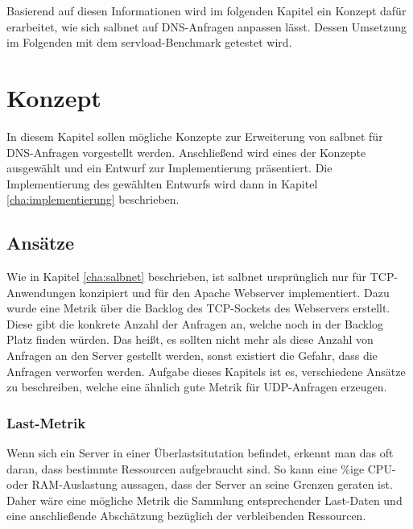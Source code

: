 \documentclass[a4paper, 12pt, BCOR10mm, DIV12, toc=bibliography, toc=listof, german]{scrbook}
\begin{document}
			Basierend auf diesen Informationen wird im folgenden Kapitel ein Konzept dafür erarbeitet, wie
			sich salbnet auf DNS-Anfragen anpassen lässt.  Dessen Umsetzung im Folgenden mit dem
			servload-Benchmark getestet wird.



	\chapter{Konzept} %
	\label{cha:konzept}

	In diesem Kapitel sollen mögliche Konzepte zur Erweiterung von salbnet für DNS-Anfragen
	vorgestellt werden. Anschließend wird eines der Konzepte ausgewählt und ein Entwurf zur Implementierung
	präsentiert. Die Implementierung des gewählten Entwurfs wird dann in Kapitel
	\ref{cha:implementierung} beschrieben.


		\section{Ansätze} %
		\label{sec:ansaetze}

		Wie in Kapitel \ref{cha:salbnet} beschrieben, ist salbnet ursprünglich nur für TCP-Anwendungen
		konzipiert und für den Apache Webserver implementiert. Dazu wurde eine Metrik über die Backlog
		des TCP-Sockets des Webservers erstellt. Diese gibt die konkrete Anzahl der Anfragen an, welche
		noch in der Backlog Platz finden würden. Das heißt, es sollten nicht mehr als diese Anzahl von
		Anfragen an den Server gestellt werden, sonst existiert die Gefahr, dass die Anfragen verworfen
		werden. Aufgabe dieses Kapitels ist es, verschiedene Ansätze zu beschreiben, welche eine ähnlich
		gute Metrik für UDP-Anfragen erzeugen.

		\subsection*{Last-Metrik} %

		Wenn sich ein Server in einer Überlastsitutation befindet, erkennt man das oft daran, dass
		bestimmte Ressourcen aufgebraucht sind. So kann eine \unit[100]{\%}ige CPU- oder RAM-Auslastung aussagen,
		dass der Server an seine Grenzen geraten ist. Daher wäre eine mögliche Metrik die Sammlung
		entsprechender Last-Daten und eine anschließende Abschätzung bezüglich der verbleibenden
		Ressourcen.
		
\end{document}
